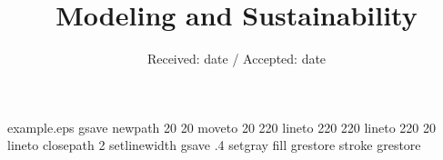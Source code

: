 \begin{filecontents*}{example.eps}
gsave
newpath
  20 20 moveto
  20 220 lineto
  220 220 lineto
  220 20 lineto
closepath
2 setlinewidth
gsave
  .4 setgray fill
grestore
stroke
grestore
\end{filecontents*}

\RequirePackage{fix-cm}
\documentclass{svjour3}                     %
%
\smartqed  %

\usepackage{url}
\usepackage{listings}
\usepackage{enumerate}
\usepackage{cite}
\usepackage{comment}
\usepackage{graphicx}
\usepackage[outdir=./]{epstopdf}
\usepackage{todonotes}
\usepackage{multirow}
\usepackage{subfigure}
\usepackage{tikz}
\usepackage{array}
\newcolumntype{P}[1]{>{\centering\arraybackslash}p{#1}}
\newcolumntype{M}[1]{>{\centering\arraybackslash}m{#1}}

\newcommand*\circled[1]{\tikz[baseline=(char.base)]{
            \node[shape=circle,draw,inner sep=2pt] (char) {#1};}}
                        






\title{Modeling and Sustainability}



\date{Received: date / Accepted: date}


\maketitle

